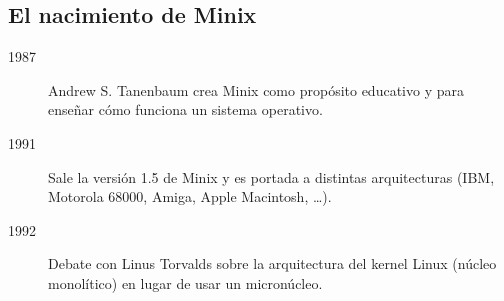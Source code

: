\documentclass{../../../yukibook.cls/yukibook}
\begin{document}
\subsection{El nacimiento de Minix}
\begin{description}
\item[1987]Andrew S. Tanenbaum crea  Minix como propósito educativo y para enseñar cómo funciona un sistema operativo.

\item[1991]Sale la versión 1.5 de Minix y es portada a distintas arquitecturas (IBM, Motorola 68000, Amiga, Apple Macintosh, …).

\item[1992]Debate con Linus Torvalds sobre la arquitectura del kernel Linux (núcleo monolítico) en lugar de usar un micronúcleo.

\end{description}
\end{document}
